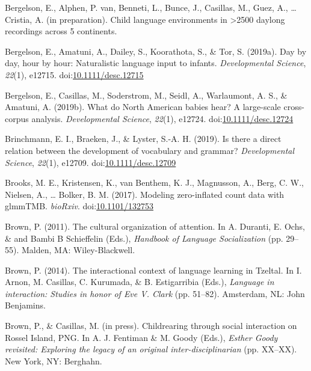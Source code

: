 \documentclass[,man,floatsintext]{apa6}
\begin{document}
\hypertarget{ref-bergelsonIPbsl}{}
Bergelson, E., Alphen, P. van, Benneti, L., Bunce, J., Casillas, M.,
Guez, A., \ldots{} Cristia, A. (in preparation). Child language
environments in \textgreater{}2500 daylong recordings across 5
continents.

\hypertarget{ref-bergelson2019day}{}
Bergelson, E., Amatuni, A., Dailey, S., Koorathota, S., \& Tor, S.
(2019a). Day by day, hour by hour: Naturalistic language input to
infants. \emph{Developmental Science}, \emph{22}(1), e12715.
doi:\href{https://doi.org/10.1111/desc.12715}{10.1111/desc.12715}

\hypertarget{ref-bergelsoncasillas2019what}{}
Bergelson, E., Casillas, M., Soderstrom, M., Seidl, A., Warlaumont, A.
S., \& Amatuni, A. (2019b). What do North American babies hear? A
large-scale cross-corpus analysis. \emph{Developmental Science},
\emph{22}(1), e12724.
doi:\href{https://doi.org/10.1111/desc.12724}{10.1111/desc.12724}

\hypertarget{ref-brinchmann2019direct}{}
Brinchmann, E. I., Braeken, J., \& Lyster, S.-A. H. (2019). Is there a
direct relation between the development of vocabulary and grammar?
\emph{Developmental Science}, \emph{22}(1), e12709.
doi:\href{https://doi.org/10.1111/desc.12709}{10.1111/desc.12709}

\hypertarget{ref-brooks2017modeling}{}
Brooks, M. E., Kristensen, K., van Benthem, K. J., Magnusson, A., Berg,
C. W., Nielsen, A., \ldots{} Bolker, B. M. (2017). Modeling
zero-inflated count data with glmmTMB. \emph{bioRxiv}.
doi:\href{https://doi.org/10.1101/132753}{10.1101/132753}

\hypertarget{ref-brown2011cultural}{}
Brown, P. (2011). The cultural organization of attention. In A. Duranti,
E. Ochs, \& and Bambi B Schieffelin (Eds.), \emph{Handbook of Language
Socialization} (pp. 29--55). Malden, MA: Wiley-Blackwell.

\hypertarget{ref-brown2014interactional}{}
Brown, P. (2014). The interactional context of language learning in
Tzeltal. In I. Arnon, M. Casillas, C. Kurumada, \& B. Estigarribia
(Eds.), \emph{Language in interaction: Studies in honor of Eve V. Clark}
(pp. 51--82). Amsterdam, NL: John Benjamins.

\hypertarget{ref-brownIPchildrearing}{}
Brown, P., \& Casillas, M. (in press). Childrearing through social
interaction on Rossel Island, PNG. In A. J. Fentiman \& M. Goody (Eds.),
\emph{Esther Goody revisited: Exploring the legacy of an original
inter-disciplinarian} (pp. XX--XX). New York, NY: Berghahn.
\end{document}
